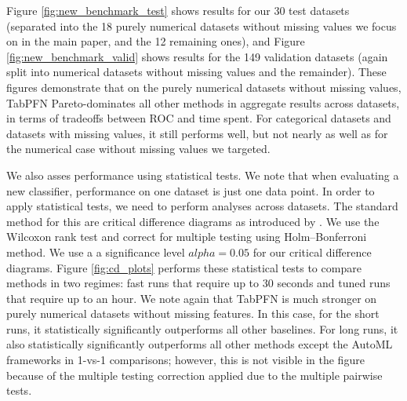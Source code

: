\documentclass{article}
\begin{document}
Figure \ref{fig:new_benchmark_test} shows results for our 30 test datasets (separated into the 18 purely numerical datasets without missing values we focus on in the main paper, and the 12 remaining ones), and Figure \ref{fig:new_benchmark_valid} shows results for the 149 validation datasets (again split into numerical datasets without missing values and the remainder). These figures demonstrate that on the purely numerical datasets without missing values, TabPFN Pareto-dominates all other methods in aggregate results across datasets, in terms of tradeoffs between ROC and time spent. For categorical datasets and datasets with missing values, it still performs well, but not nearly as well as for the numerical case without missing values we targeted.

We also asses performance using statistical tests. We note that when evaluating a new classifier, performance on one dataset is just one data point. In order to apply statistical tests, we need to perform analyses across datasets. The standard method for this are critical difference diagrams as introduced by \citet{demsar-06a}. We use the Wilcoxon rank test and correct for multiple testing using Holm–Bonferroni method. We use a a significance level $alpha = 0.05$ for our critical difference diagrams.
Figure \ref{fig:cd_plots} performs these statistical tests to compare methods in two regimes: fast runs that require up to 30 seconds and tuned runs that require up to an hour. We note again that TabPFN is much stronger on purely numerical datasets without missing features. In this case, for the short runs, it statistically significantly outperforms all other baselines. For long runs, it also statistically significantly outperforms all other methods except the AutoML frameworks in 1-vs-1 comparisons; however, this is not visible in the figure because of the multiple testing correction applied due to the multiple pairwise tests.
\end{document}
